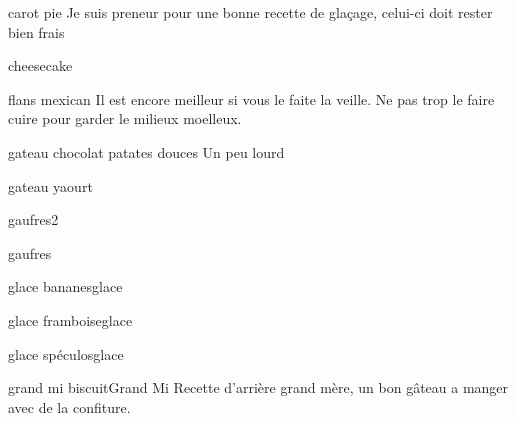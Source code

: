 	\begin{recette}{\heart carot pie}{}
		Je suis preneur pour une bonne recette de glaçage, celui-ci doit rester bien frais 
	\end{recette}
	
	\begin{recette}{cheesecake}{}
	\end{recette}
	
	\begin{recette}{\heart flans mexican}{}
		Il est encore meilleur si vous le faite la veille. Ne pas trop le faire cuire pour garder le milieux moelleux.
	\end{recette}
	
	\begin{recette}{gateau chocolat patates douces}{}
		Un peu lourd
	\end{recette}
	
	\begin{recette}{gateau yaourt}{}
	\end{recette}
	
	\begin{recette}{gaufres2}{}
	\end{recette}
	
	\begin{recette}{gaufres}{}
	\end{recette}
	
	\begin{recette}{glace bananes}{glace}
	\end{recette}
	
	\begin{recette}{glace framboise}{glace}
	\end{recette}
	
	\begin{recette}{glace spéculos}{glace}
	\end{recette}
	
	\begin{recette}{\heart grand mi biscuit}{Grand Mi}
		Recette d'arrière grand mère, un bon gâteau a manger avec de la confiture. 
	\end{recette}
	
